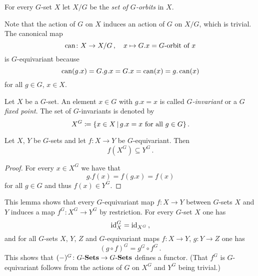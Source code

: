 \begin{definition}
  For every $G$-set $X$ let $X/G$ be the \emph{set of $G$-orbits} in $X$.
\end{definition}


\begin{fluff}
  Note that the action of $G$ on $X$ induces an action of $G$ on $X/G$, which is trivial.
  The canonical map
  \[
            \operatorname{can}
    \colon  X
    \to     X/G \,,
    \quad   x
    \mapsto G.x
    =       \text{$G$-orbit of $x$}
  \]
  is $G$-equivariant because
  \[
      \operatorname{can}(g.x)
    = G.g.x
    = G.x
    = \operatorname{can}(x)
    = g.\operatorname{can}(x)
  \]
  for all $g \in G$, $x \in X$.
\end{fluff}


\begin{definition}
  Let $X$ be a $G$-set.
  An element $x \in G$ with $g.x = x$ is called \emph{$G$-invariant} or a \emph{$G$ fixed point}.
  The set of $G$-invariants is denoted by
  \[
              X^G
    \defined  \{
                x \in X
              \suchthat
                \text{$g.x = x$ for all $g \in G$}
              \} \,.
  \]
\end{definition}


\begin{lemma}
  Let $X$, $Y$ be $G$-sets and let $f \colon X \to Y$ be $G$-equivariant.
  Then
  \[
              f\left( X^G \right)
    \subseteq Y^G \,.
  \]
\end{lemma}
\begin{proof}
  For every $x \in X^G$ we have that
  \[
      g.f(x)
    = f(g.x)
    = f(x)
  \]
  for all $g \in G$ and thus $f(x) \in Y^G$.
\end{proof}


\begin{fluff}
  This lemma shows that every $G$-equivariant map $f \colon X \to Y$ between $G$-sets $X$ and $Y$ induces a map $f^G \colon X^G \to Y^G$ by restriction.
  For every $G$-set $X$ one has
  \[
      \operatorname{id}_X^G
    = \operatorname{id}_{X^G} \,,
  \]
  and for all $G$-sets $X$, $Y$, $Z$ and $G$-equivariant maps $f \colon X \to Y$, $g \colon Y \to Z$ one has
  \[
      (g \circ f)^G
    = g^G \circ f^G \,.
  \]
  This shows that $(-)^G \colon G\text{-}\mathbf{Sets} \to G\text{-}\mathbf{Sets}$ defines a functor.
  (That $f^G$ is $G$-equivariant follows from the actions of $G$ on $X^G$ and $Y^G$ being trivial.)
\end{fluff}


